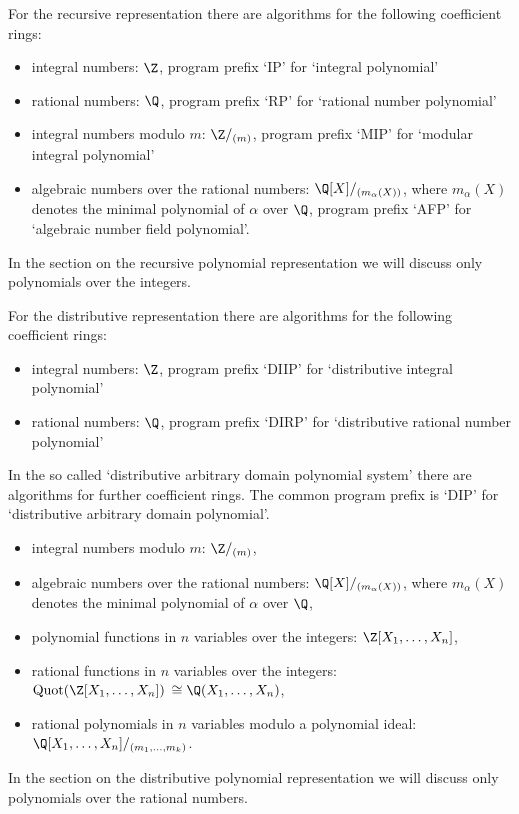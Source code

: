 For the recursive representation there are 
algorithms for the following 
coefficient rings:
\begin{itemize}
\item integral numbers: $\Z$, 
      program prefix `IP' for `integral polynomial' 
\item rational numbers: $\Q$, 
      program prefix `RP' for `rational number polynomial' 
\item integral numbers modulo $m$: $\Z/_{(m)}$, 
      program prefix `MIP' for `modular integral polynomial' 
\item algebraic numbers over the rational numbers: 
      $\Q\lbrack X \rbrack/_{(m_{\alpha}(X))}$, 
      where $m_{\alpha}(X)$ denotes the minimal polynomial 
      of $\alpha$ over $\Q$,
      program prefix `AFP' for `algebraic number field polynomial'. 
\end{itemize}
In the section on the recursive polynomial representation we will 
discuss only polynomials over the integers.

For the distributive representation there are 
algorithms for the following 
coefficient rings:
\begin{itemize}
\item integral numbers: $\Z$, 
      program prefix `DIIP' for `distributive integral polynomial' 
\item rational numbers: $\Q$, 
      program prefix `DIRP' for `distributive rational 
      number polynomial' 
\end{itemize}
In the so called `distributive arbitrary 
domain polynomial system' there are algorithms 
for further coefficient rings. The common program prefix 
is `DIP' for `distributive arbitrary domain polynomial'.
\begin{itemize}
\item integral numbers modulo $m$: $\Z/_{(m)}$, 
\item algebraic numbers over the rational numbers: 
      $\Q\lbrack X \rbrack/_{(m_{\alpha}(X))}$, 
      where $m_{\alpha}(X)$ denotes the minimal polynomial 
      of $\alpha$ over $\Q$,
\item polynomial functions in $n$ variables over the integers: 
      $\Z\lbrack X_1, \ldots, X_n \rbrack$, 
\item rational functions in $n$ variables over the integers: \\
      ${\rm Quot}(\Z\lbrack X_1, \ldots, X_n \rbrack)$ 
      $\cong \Q(X_1, \ldots, X_n)$, 
\item rational polynomials in $n$ variables modulo a 
      polynomial ideal: \\ 
      $\Q\lbrack X_1, \ldots, X_n \rbrack/_{(m_1, \ldots, m_k)}$. 
\end{itemize}
In the section on the distributive polynomial representation we will 
discuss only polynomials over the rational numbers.


